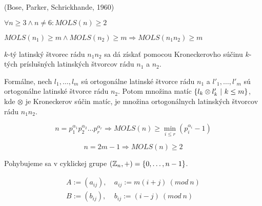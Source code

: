 \begin{theorem_hard}{(Bose, Parker, Schrickhande, 1960)}

$\forall n \geq 3 \wedge n \neq 6: MOLS(n) \geq 2$

\end{theorem_hard}

\begin{theorem}
$MOLS(n_1) \geq m \wedge MOLS(n_2) \geq m \Rightarrow MOLS(n_1 n_2) \geq m$
\end{theorem}

\begin{construction}
$k$-tý latinský štvorec rádu $n_1 n_2$ sa dá získať pomocou Kroneckerovho súčinu $k$-tých príslušných latinských štvorcov rádu $n_1$ a $n_2$.

Formálne, nech $l_1, \ldots, l_m$ sú ortogonálne latinské štvorce rádu $n_1$ a $l'_1, \ldots, l'_m$ sú ortogonálne latinské štvorce rádu $n_2$.
Potom množina matíc $\left\{l_k \otimes l'_k ~|~ k \leq m\right\}$, kde $\otimes$ je Kroneckerov súčin matíc, je množina ortogonálnych latinských štvorcov rádu $n_1 n_2$.
\end{construction}

\begin{corollary}
$$n = p_1^{\alpha_1} p_2^{\alpha_2} \ldots p_r^{\alpha_r} \Rightarrow MOLS(n) \geq \min_{i \leq r} (p_i^{\alpha_i} - 1)$$
\end{corollary}

\begin{theorem}
$$n = 2m - 1 \Rightarrow MOLS(n) \geq 2$$
\end{theorem}

\begin{construction}

Pohybujeme sa v cyklickej grupe $(\mathbb{Z}_n, +) = \left\{0, \ldots, n-1\right\}$.

\begin{align*}
A := (a_{ij}),~& a_{ij} := m (i+j)~(mod~n) \\
B := (b_{ij}),~& b_{ij} := (i-j)  ~(mod~n)    
\end{align*}
\end{construction}
